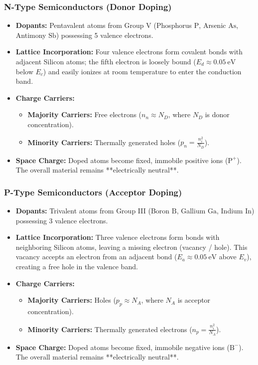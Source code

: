 \subsubsection{N-Type Semiconductors (Donor Doping)}
\begin{itemize}
    \item \textbf{Dopants:} Pentavalent atoms from Group V (Phosphorus $\text{P}$, Arsenic $\text{As}$, Antimony $\text{Sb}$) possessing 5 valence electrons.
    \item \textbf{Lattice Incorporation:} Four valence electrons form covalent bonds with adjacent Silicon atoms; the fifth electron is loosely bound ($E_d \approx \SI{0.05}{\electronvolt}$ below $E_c$) and easily ionizes at room temperature to enter the conduction band.
    \item \textbf{Charge Carriers:}
    \begin{itemize}
        \item \textbf{Majority Carriers:} Free electrons ($n_n \approx N_D$, where $N_D$ is donor concentration).
        \item \textbf{Minority Carriers:} Thermally generated holes ($p_n = \frac{n_i^2}{N_D}$).
    \end{itemize}
    \item \textbf{Space Charge:} Doped atoms become fixed, immobile positive ions ($\text{P}^+$). The overall material remains **electrically neutral**.
\end{itemize}

\subsubsection{P-Type Semiconductors (Acceptor Doping)}
\begin{itemize}
    \item \textbf{Dopants:} Trivalent atoms from Group III (Boron $\text{B}$, Gallium $\text{Ga}$, Indium $\text{In}$) possessing 3 valence electrons.
    \item \textbf{Lattice Incorporation:} Three valence electrons form bonds with neighboring Silicon atoms, leaving a missing electron (vacancy / hole). This vacancy accepts an electron from an adjacent bond ($E_a \approx \SI{0.05}{\electronvolt}$ above $E_v$), creating a free hole in the valence band.
    \item \textbf{Charge Carriers:}
    \begin{itemize}
        \item \textbf{Majority Carriers:} Holes ($p_p \approx N_A$, where $N_A$ is acceptor concentration).
        \item \textbf{Minority Carriers:} Thermally generated electrons ($n_p = \frac{n_i^2}{N_A}$).
    \end{itemize}
    \item \textbf{Space Charge:} Doped atoms become fixed, immobile negative ions ($\text{B}^-$). The overall material remains **electrically neutral**.
\end{itemize}

